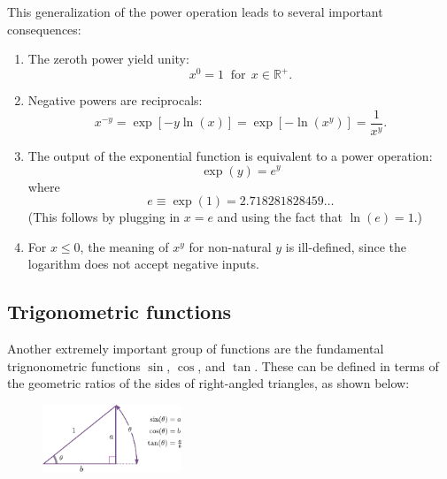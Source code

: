 \documentclass[10pt,a4paper]{article}
\begin{document}
This generalization of the power operation leads to several important
consequences:
\begin{enumerate}
\item The zeroth power yield unity:
  \begin{equation}
    \displaystyle x^0 = 1 \;\;\mathrm{for}\;\, x \in \mathbb{R}^+.
  \end{equation}

\item Negative powers are reciprocals:
  \begin{equation}
    x^{-y} = \exp[-y\ln(x)] = \exp[-\ln(x^y)] = \frac{1}{x^y}.
  \end{equation}

\item The output of the exponential function is equivalent to a power
  operation:
  \begin{equation}
    \exp(y) = e^y
  \end{equation}
  where
  \begin{equation}
    e \equiv \exp(1) = 2.718281828459\!\dots
  \end{equation}
  (This follows by plugging in $x=e$ and using the fact that $\ln(e) =
  1$.)

\item For $x \le 0$, the meaning of $x^y$ for non-natural $y$ is
  ill-defined, since the logarithm does not accept negative inputs.
\end{enumerate}

\clearpage

\subsection{Trigonometric functions}
\label{trigonometric-functions}

Another extremely important group of functions are the fundamental
trignonometric functions $\sin$, $\cos$, and $\tan$. These can be
defined in terms of the geometric ratios of the sides of right-angled
triangles, as shown below:

\begin{figure}[h!]
  \centering\includegraphics[width=0.37\textwidth]{trigonometry}
\end{figure}
\end{document}
